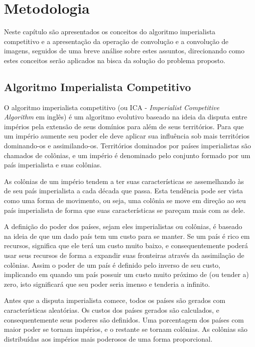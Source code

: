 \chapter{Metodologia}
\label{Metodologia}
%


Neste capítulo são apresentados os conceitos do algoritmo imperialista competitivo e a apresentação da operação de convolução e a convolução de imagens, seguidos de uma breve análise sobre estes assuntos, direcionando como estes conceitos serão aplicados na bisca da solução do problema proposto.

\section{Algoritmo Imperialista Competitivo}

O algoritmo imperialista competitivo \cite{atashpaz2007imperialist} (ou ICA - \emph{Imperialist Competitive Algorithm} em inglês) é um algoritmo evolutivo baseado na ideia da disputa entre impérios pela extensão de seus domínios para além de seus territórios. Para que um império aumente seu poder ele deve aplicar sua influência sob mais territórios dominando-os e assimilando-os. Territórios dominados por países imperialistas são chamados de colônias, e um império é denominado pelo conjunto formado por um país imperialista e suas colônias.

As colônias de um império tendem a ter suas características se assemelhando às de seu país imperialista a cada década que passa. Esta tendência pode ser vista como uma forma de movimento, ou seja, uma colônia se move em direção ao seu país imperialista de forma que suas características se pareçam mais com as dele.

A definição do poder dos países, sejam eles imperialistas ou colônias, é baseado na ideia de que um dado país tem um custo para se manter. Se um país é rico em recursos, significa que ele terá um custo muito baixo, e consequentemente poderá usar seus recursos de forma a expandir suas fronteiras através da assimilação de colônias. Assim o poder de um país é definido pelo inverso de seu custo, implicando em quando um país possuir um custo muito próximo de (ou tender a) zero, isto significará que seu poder seria imenso e tenderia a infinito.

Antes que a disputa imperialista comece, todos os países são gerados com características aleatórias. Os custos dos países gerados são calculados, e consequentemente seus poderes são definidos. Uma porcentagem dos países com maior poder se tornam impérios, e o restante se tornam colônias. As colônias são distribuídas aos impérios mais poderosos de uma forma proporcional.

